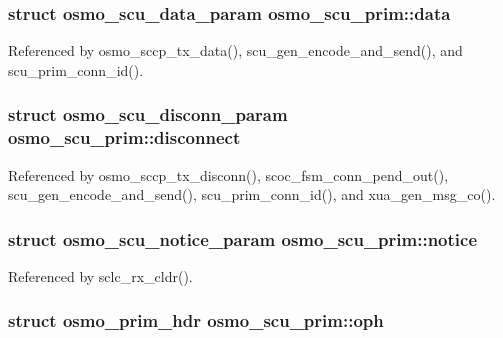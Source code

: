 \subsubsection[{data}]{\setlength{\rightskip}{0pt plus 5cm}struct {\bf osmo\+\_\+scu\+\_\+data\+\_\+param} osmo\+\_\+scu\+\_\+prim\+::data}\label{structosmo__scu__prim_abb32a8ee3f60be2c851a8248264d580a}


Referenced by osmo\+\_\+sccp\+\_\+tx\+\_\+data(), scu\+\_\+gen\+\_\+encode\+\_\+and\+\_\+send(), and scu\+\_\+prim\+\_\+conn\+\_\+id().

\subsubsection[{disconnect}]{\setlength{\rightskip}{0pt plus 5cm}struct {\bf osmo\+\_\+scu\+\_\+disconn\+\_\+param} osmo\+\_\+scu\+\_\+prim\+::disconnect}\label{structosmo__scu__prim_a7faff854a507bb7fa3b676c928e8f89e}


Referenced by osmo\+\_\+sccp\+\_\+tx\+\_\+disconn(), scoc\+\_\+fsm\+\_\+conn\+\_\+pend\+\_\+out(), scu\+\_\+gen\+\_\+encode\+\_\+and\+\_\+send(), scu\+\_\+prim\+\_\+conn\+\_\+id(), and xua\+\_\+gen\+\_\+msg\+\_\+co().

\subsubsection[{notice}]{\setlength{\rightskip}{0pt plus 5cm}struct {\bf osmo\+\_\+scu\+\_\+notice\+\_\+param} osmo\+\_\+scu\+\_\+prim\+::notice}\label{structosmo__scu__prim_a4aa1b5f7b529cf68723b6f7c8facc078}


Referenced by sclc\+\_\+rx\+\_\+cldr().

\subsubsection[{oph}]{\setlength{\rightskip}{0pt plus 5cm}struct osmo\+\_\+prim\+\_\+hdr osmo\+\_\+scu\+\_\+prim\+::oph}\label{structosmo__scu__prim_a0bf42a60284d6fae886b610b868b7d52}


